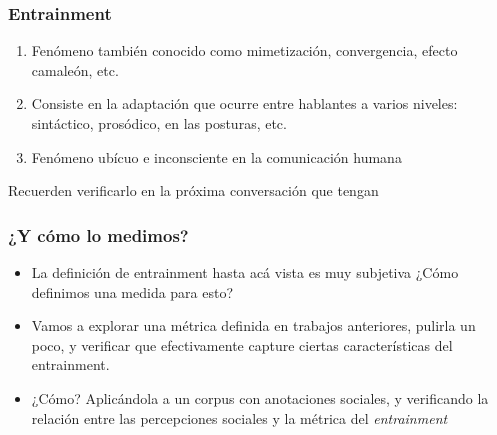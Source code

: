 \begin{frame}
  \frametitle{Entrainment}

  \begin{enumerate}
    \item Fenómeno también conocido como mimetización, convergencia, efecto camaleón, etc.
    \item Consiste en la adaptación que ocurre entre hablantes a varios niveles: sintáctico, prosódico, en las posturas, etc.
    \item Fenómeno ubícuo e inconsciente en la comunicación humana
  \end{enumerate}

  Recuerden verificarlo en la próxima conversación que tengan
\end{frame}

\begin{frame}
  \frametitle{¿Y cómo lo medimos?}

  \begin{itemize}
    \item La definición de entrainment hasta acá vista es muy subjetiva ¿Cómo definimos una medida para esto?
    \item Vamos a explorar una métrica definida en trabajos anteriores, pulirla un poco, y verificar que efectivamente capture ciertas características del entrainment.
    \item ¿Cómo? Aplicándola a un corpus con anotaciones sociales, y verificando la relación entre las percepciones sociales y la métrica del \emph{entrainment}

  \end{itemize}




\end{frame}
